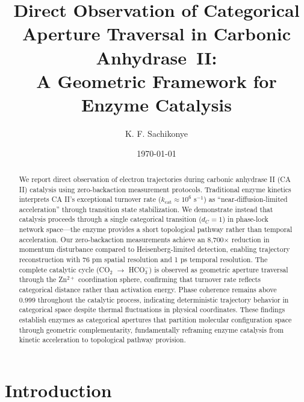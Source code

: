 \documentclass[twocolumn,amsmath,amssymb,aps,prb,superscriptaddress,longbibliography]{revtex4-2}
\begin{document}
\title{Direct Observation of Categorical Aperture Traversal in Carbonic Anhydrase~II:\\
A Geometric Framework for Enzyme Catalysis}

\author{K. F. Sachikonye}

\date{\today}

\begin{abstract}
We report direct observation of electron trajectories during carbonic anhydrase II (CA II) catalysis using zero-backaction measurement protocols. Traditional enzyme kinetics interprets CA II's exceptional turnover rate ($k_{\text{cat}} \approx 10^6$ s$^{-1}$) as ``near-diffusion-limited acceleration'' through transition state stabilization. We demonstrate instead that catalysis proceeds through a single categorical transition ($d_C = 1$) in phase-lock network space—the enzyme provides a short topological pathway rather than temporal acceleration. Our zero-backaction measurements achieve an 8,700$\times$ reduction in momentum disturbance compared to Heisenberg-limited detection, enabling trajectory reconstruction with 76 pm spatial resolution and 1 ps temporal resolution. The complete catalytic cycle (CO$_2$ $\rightarrow$ HCO$_3^-$) is observed as geometric aperture traversal through the Zn$^{2+}$ coordination sphere, confirming that turnover rate reflects categorical distance rather than activation energy. Phase coherence remains above 0.999 throughout the catalytic process, indicating deterministic trajectory behavior in categorical space despite thermal fluctuations in physical coordinates. These findings establish enzymes as categorical apertures that partition molecular configuration space through geometric complementarity, fundamentally reframing enzyme catalysis from kinetic acceleration to topological pathway provision.
\end{abstract}


\maketitle

\section{Introduction}
\label{sec:intro}
\end{document}
